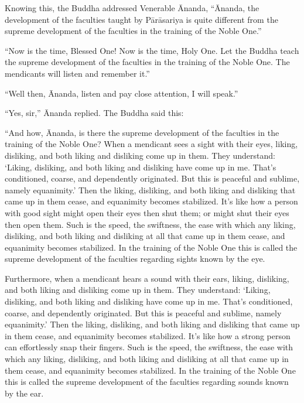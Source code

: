 \documentclass[12pt,openany]{book}%
\begin{document}
Knowing this, the Buddha addressed Venerable Ānanda, “Ānanda, the development of the faculties taught by \textsanskrit{Pārāsariya} is quite different from the supreme development of the faculties in the training of the Noble One.” 

“Now is the time, Blessed One! Now is the time, Holy One. Let the Buddha teach the supreme development of the faculties in the training of the Noble One. The mendicants will listen and remember it.” 

“Well then, Ānanda, listen and pay close attention, I will speak.” 

“Yes, sir,” Ānanda replied. The Buddha said this: 

“And how, Ānanda, is there the supreme development of the faculties in the training of the Noble One? When a mendicant sees a sight with their eyes, liking, disliking, and both liking and disliking come up in them. They understand: ‘Liking, disliking, and both liking and disliking have come up in me. That’s conditioned, coarse, and dependently originated. But this is peaceful and sublime, namely equanimity.’ Then the liking, disliking, and both liking and disliking that came up in them cease, and equanimity becomes stabilized. It’s like how a person with good sight might open their eyes then shut them; or might shut their eyes then open them. Such is the speed, the swiftness, the ease with which any liking, disliking, and both liking and disliking at all that came up in them cease, and equanimity becomes stabilized. In the training of the Noble One this is called the supreme development of the faculties regarding sights known by the eye. 

Furthermore, when a mendicant hears a sound with their ears, liking, disliking, and both liking and disliking come up in them. They understand: ‘Liking, disliking, and both liking and disliking have come up in me. That’s conditioned, coarse, and dependently originated. But this is peaceful and sublime, namely equanimity.’ Then the liking, disliking, and both liking and disliking that came up in them cease, and equanimity becomes stabilized. It’s like how a strong person can effortlessly snap their fingers. Such is the speed, the swiftness, the ease with which any liking, disliking, and both liking and disliking at all that came up in them cease, and equanimity becomes stabilized. In the training of the Noble One this is called the supreme development of the faculties regarding sounds known by the ear. 
\end{document}
